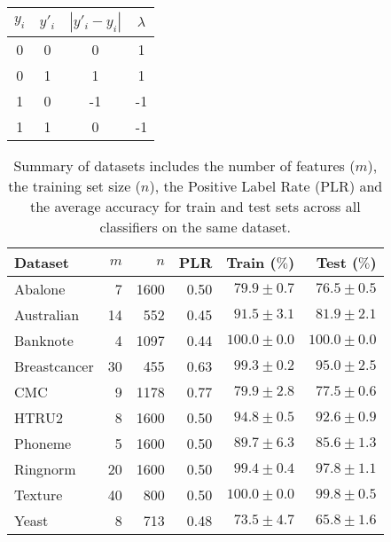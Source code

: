 \begin{table}
    \footnotesize
    \centering
    \caption{}
    \begin{tabular}{c|c|c|c}
        \toprule
        $y_i$ & $y'_i$ & $|y'_i-y_i|$ & $\lambda$ \\
        \midrule
        0 & 0 & 0 & 1 \\
        0 & 1 & 1 & 1 \\
        1 & 0 & -1 & -1 \\
        1 & 1 & 0 & -1 \\
        \bottomrule
    \end{tabular}
    \label{table.y}
\end{table}


\begin{table}[t!]
    \footnotesize
    \centering
    \caption{Summary of datasets includes the number of features ($m$), the training set size ($n$), the Positive Label Rate (PLR) and the average accuracy for train and test sets across all classifiers on the same dataset.}
    \begin{tabular}{l|r|r|r|r|r}
        \toprule
        Dataset         & $m$ & $n$ & PLR  & Train ($\%$) & Test ($\%$) \\
        \midrule
        Abalone      & 7  & 1600 & 0.50 & $79.9\pm0.7$ &  $76.5\pm0.5$ \\
        Australian   & 14 & 552  & 0.45 & $91.5\pm3.1$ &  $81.9\pm2.1$ \\
        Banknote     & 4  & 1097 & 0.44 & $100.0\pm0.0$ & $100.0\pm0.0$ \\
        Breastcancer & 30 & 455  & 0.63 & $99.3\pm0.2$ &  $95.0\pm2.5$ \\
        CMC          & 9  & 1178 & 0.77 & $79.9\pm2.8$ &  $77.5\pm0.6$ \\
        HTRU2        & 8  & 1600 & 0.50 & $94.8\pm0.5$ &  $92.6\pm0.9$ \\
        Phoneme      & 5  & 1600 & 0.50 & $89.7\pm6.3$ &  $85.6\pm1.3$ \\
        Ringnorm     & 20 & 1600 & 0.50 & $99.4\pm0.4$ &  $97.8\pm1.1$ \\
        Texture      & 40 & 800  & 0.50 & $100.0\pm0.0$ &  $99.8\pm0.5$ \\
        Yeast        & 8  & 713  & 0.48 & $73.5\pm4.7$ &  $65.8\pm1.6$ \\
        \bottomrule
    \end{tabular}
    \label{tab.datasets}
\end{table}


